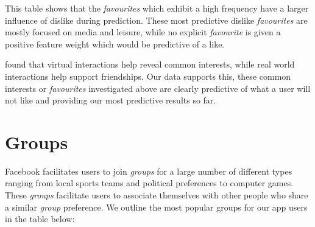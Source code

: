 This table shows that the \emph{favourites} which exhibit a high frequency have a larger influence of dislike during prediction. These most 
predictive dislike \emph{favourites} are mostly focused on media and leisure, while no explicit \emph{favourite} is given a positive feature 
weight which would be predictive of a like.

\cite{brandtzag2011facebook} found that virtual interactions help reveal common interests, while real world interactions help 
support friendships. Our data supports this, these common interests or \emph{favourites} investigated above are clearly predictive 
of what a user will not like and providing our most predictive results so far.


\section{Groups}
\label{sec:groups}

Facebook facilitates users to join \emph{groups} for a large number of different types ranging from 
local sports teams and political preferences to computer games. These \emph{groups} facilitate users to associate
themselves with other people who share a similar \emph{group} preference. We outline the most popular groups for our app users 
in the table below:


